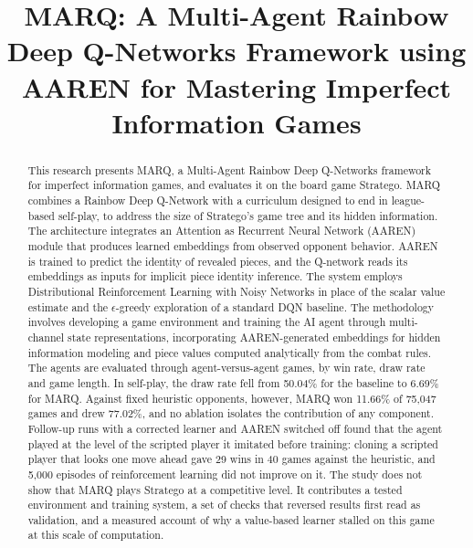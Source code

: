 \documentclass[oneside]{etd}
\title{MARQ: A Multi-Agent Rainbow Deep Q-Networks Framework using AAREN for Mastering Imperfect Information Games}
\begin{document}
\maketitle
\makerecomm
\makeacceptance
\makedeclaration


\begin{abstract}
This research presents MARQ, a Multi-Agent Rainbow Deep Q-Networks framework for imperfect information games, and evaluates it on the board game Stratego. MARQ combines a Rainbow Deep Q-Network with a curriculum designed to end in league-based self-play, to address the size of Stratego's game tree and its hidden information. The architecture integrates an Attention as Recurrent Neural Network (AAREN) module that produces learned embeddings from observed opponent behavior. AAREN is trained to predict the identity of revealed pieces, and the Q-network reads its embeddings as inputs for implicit piece identity inference. The system employs Distributional Reinforcement Learning with Noisy Networks in place of the scalar value estimate and the $\epsilon$-greedy exploration of a standard DQN baseline. The methodology involves developing a game environment and training the AI agent through multi-channel state representations, incorporating AAREN-generated embeddings for hidden information modeling and piece values computed analytically from the combat rules. The agents are evaluated through agent-versus-agent games, by win rate, draw rate and game length. In self-play, the draw rate fell from 50.04\% for the baseline to 6.69\% for MARQ. Against fixed heuristic opponents, however, MARQ won 11.66\% of 75,047 games and drew 77.02\%, and no ablation isolates the contribution of any component. Follow-up runs with a corrected learner and AAREN switched off found that the agent played at the level of the scripted player it imitated before training: cloning a scripted player that looks one move ahead gave 29 wins in 40 games against the heuristic, and 5,000 episodes of reinforcement learning did not improve on it. The study does not show that MARQ plays Stratego at a competitive level. It contributes a tested environment and training system, a set of checks that reversed results first read as validation, and a measured account of why a value-based learner stalled on this game at this scale of computation.
\end{abstract}
\end{document}
